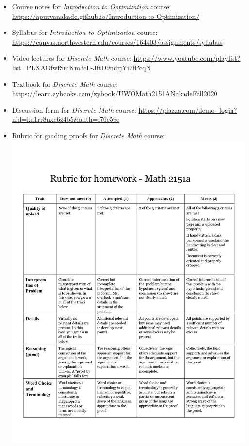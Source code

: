 \documentclass[
]{report}
\begin{document}
\begin{itemize}
\item
  Course notes for \emph{Introduction to Optimization} course: \url{https://apurvanakade.github.io/Introduction-to-Optimization/}
\item
  Syllabus for \emph{Introduction to Optimization} course: \url{https://canvas.northwestern.edu/courses/164403/assignments/syllabus}
\item
  Video lectures for \emph{Discrete Math} course: \url{https://www.youtube.com/playlist?list=PLXAOfwfSuiKm3cL-JftD9ndrjYi7fPcqN}
\item
  Textbook for \emph{Discrete Math} course: \url{https://learn.zybooks.com/zybook/UWOMath2151ANakadeFall2020}
\item
  Discussion form for \emph{Discrete Math} course: \url{https://piazza.com/demo_login?nid=kd1rr8nxc6z4b5\&auth=f76e59e}
\item
  Rubric for grading proofs for \emph{Discrete Math} course:
  \includegraphics{images/Rubric for homework - Math 2151a_page-0001.jpg}
\end{itemize}
\end{document}
